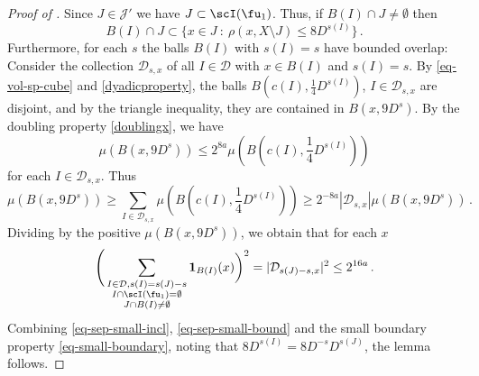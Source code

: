     \begin{proof}[Proof of ]
        Since $J \in \mathcal{J}'$ we have $J \subset \scI(\fu_1)$. Thus, if $B(I) \cap J \ne \emptyset$ then
    \begin{equation}
        \label{eq-sep-small-incl}
        B(I) \cap J \subset \{x \in J \ : \ \rho(x, X \setminus J) \le 8D^{s(I)}\}\,.
    \end{equation}
    Furthermore, for each $s$ the balls $B(I)$ with $s(I) = s$ have bounded overlap: Consider the collection $\mathcal{D}_{s,x}$ of all $I \in \mathcal{D}$ with $x \in B(I)$ and $s(I) = s$. By \eqref{eq-vol-sp-cube} and \eqref{dyadicproperty}, the balls $B(c(I), \frac{1}{4} D^{s(I)})$, $I \in \mathcal{D}_{s,x}$ are disjoint, and by the triangle inequality, they are contained in $B(x, 9 D^{s})$. By the doubling property \eqref{doublingx}, we have
    $$
        \mu(B(x, 9D^{s})) \le 2^{8a} \mu(B(c(I), \frac{1}{4} D^{s(I)}))
    $$
    for each $I \in \mathcal{D}_{s,x}$.
    Thus
    $$
        \mu(B(x, 9D^{s})) \ge \sum_{I \in \mathcal{D}_{s,x}} \mu(B(c(I), \frac{1}{4} D^{s(I)})) \ge 2^{-8a} |\mathcal{D}_{s,x}| \mu(B(x, 9D^{s}))\,.
    $$
    Dividing by the positive $\mu(B(x, 9D^{s}))$, we obtain that for each $x$
    \begin{equation}
        \label{eq-sep-small-bound}
        \Bigg(\sum_{\substack{I \in \mathcal{D}, s(I) = s(J) - s\\ I \cap \scI(\fu_1) = \emptyset\\
        J \cap B(I) \ne \emptyset}} \mathbf{1}_{B(I)}(x) \bigg)^2 = |\mathcal{D}_{s(J) - s,x}|^2 \le 2^{16a} \,.
    \end{equation}
    Combining \eqref{eq-sep-small-incl}, \eqref{eq-sep-small-bound} and the small boundary property \eqref{eq-small-boundary}, noting that $8D^{s(I)}=8D^{-s}D^{s(J)}$, the lemma follows.
\end{proof}


